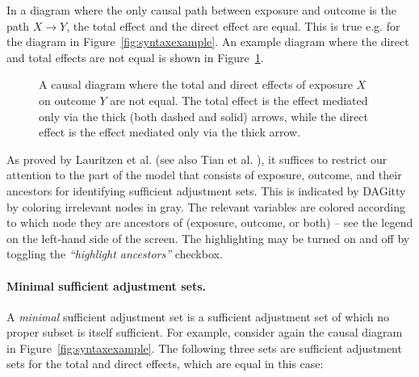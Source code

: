 \documentclass[a4paper]{article} %
\newcommand{\pp}{{\sc DAG}itty\xspace}
\newcommand{\action}[1]{\emph{``#1''}}
\begin{document}
In a diagram where the only causal path between exposure 
and outcome is the path $X \rightarrow Y$, the total effect
and the direct effect are equal. This is true e.g. for the 
diagram in Figure~\ref{fig:syntaxexample}. An example diagram where the 
direct and total effects are not equal is shown in 
Figure~\ref{fig:effects}.

\begin{figure}
\begin{center}
\end{center}

\caption{A causal diagram where the total and direct 
effects of exposure $X$ on outcome $Y$ are not equal. The total effect is the effect
mediated only via the thick (both dashed and solid) arrows,
while the direct effect is the effect mediated only 
via the thick arrow.}
\label{fig:effects}

\end{figure}

As proved by Lauritzen et al. \cite{Lauritzen1990} 
(see also Tian et al. \cite{TianPP1998}), 
it suffices to restrict our attention to the part of the model that consists of exposure, 
outcome, and their ancestors for identifying sufficient adjustment sets. This is indicated
by \pp by coloring irrelevant nodes in gray. The relevant variables are colored according 
to which node they are ancestors of (exposure, outcome, or both) -- see the legend on the 
left-hand side of the screen. The highlighting may be turned on and off by toggling the 
\action{highlight ancestors} checkbox.

\paragraph{Minimal sufficient adjustment sets.} 

A \emph{minimal} sufficient adjustment set is a sufficient 
adjustment set of which no proper subset is itself sufficient. For example, 
consider again the causal diagram in Figure~\ref{fig:syntaxexample}. 
The following three sets are sufficient adjustment sets
for the total and direct effects, which are equal in this case: 
\end{document}
